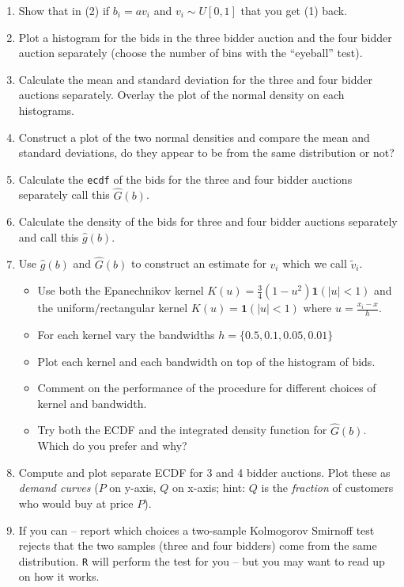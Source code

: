 \documentclass{article}
\begin{document}
\begin{enumerate}
\item Show that in (2) if $b_i = a v_i$ and $v_i \sim U[0,1]$ that you get (1) back.
\item Plot a histogram for the bids in the three bidder auction and the four bidder auction separately (choose the number of bins with the ``eyeball'' test).
\item Calculate the mean and standard deviation for the three and four bidder auctions separately. Overlay the plot of the normal density on each histograms.
\item Construct a plot of the two normal densities and compare the mean and standard deviations, do they appear to be from the same distribution or not?
\item Calculate the \texttt{ecdf} of the bids for the three and four bidder auctions separately call this $\hat{G}(b)$.
\item Calculate the density of the bids for three and four bidder auctions separately and call this $\hat{g}(b)$.
\item Use $\hat{g}(b)$ and $\hat{G}(b)$ to construct an estimate for $v_i$ which we call $\tilde{v}_i$.
\begin{itemize}
\item Use both the Epanechnikov kernel $K(u)  = \frac{3}{4} ( 1 -u^2) \mathbf{1}(|u| < 1)$ and the uniform/rectangular kernel $K(u)  = \mathbf{1}(|u| < 1)$
where $u = \frac{x_i - x}{h}$.
\item For each kernel vary the bandwidths $h = \{0.5, 0.1,0.05,0.01\}$
\item Plot each kernel and each bandwidth on top of the histogram of bids.
\item Comment on the performance of the procedure for different choices of kernel and bandwidth.
\item Try both the ECDF and the integrated density function for $\hat{G}(b)$. Which do you prefer and why?
\end{itemize}
\item Compute and plot separate ECDF for 3 and 4 bidder auctions. Plot these as \textit{demand curves} ($P$ on y-axis, $Q$ on x-axis; hint: $Q$ is the \textit{fraction} of customers who would buy at price $P$).
\item If you can -- report which choices a two-sample Kolmogorov Smirnoff test rejects that the two samples (three and four bidders) come from the same distribution. \texttt{R} will perform the test for you -- but you may want to read up on how it works.
\end{enumerate}
\end{document}
